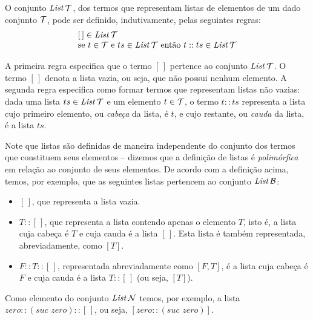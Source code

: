 \begin{Definition}
O conjunto $\textit{List\/}\, \mathcal{T}$, dos termos que representam listas de elementos de um dado conjunto $\mathcal{T}$, pode ser definido, indutivamente, pelas seguintes regras:
  \[
  \begin{array}{l}
    [\,] \in \textit{List\/}\,\mathcal{T} \\
    \text{se $t \in \mathcal{T}$ e $ts \in \textit{List\/}\,\mathcal{T}$ ent\~ao  $t :: ts \in \textit{List\/}\,\mathcal{T}$}
  \end{array}
  \]
\end{Definition}
A primeira regra especifica que o termo $[\,]$ pertence ao conjunto $\textit{List\/}\,\mathcal{T}$. O termo $[\,]$  denota a lista vazia, ou seja, que n\~ao possui nenhum elemento. A segunda regra especifica como formar termos que representam listas não vazias: dada uma lista $ts \in \textit{List\/}\,\mathcal{T}$ e um elemento $t \in\mathcal{T}$, o termo $t :: ts$ representa a lista cujo primeiro elemento, ou \emph{cabeça} da lista, é $t$, e cujo restante, ou \emph{cauda} da lista, é a lista $ts$.

Note que listas são definidas de maneira independente do conjunto dos termos que constituem seus elementos -- dizemos que a definição de listas \'e \emph{polim\'orfica\/} em rela\c{c}\~ao ao conjunto de seus elementos. De acordo com a definição acima, temos, por exemplo, que as seguintes listas pertencem ao conjunto $\textit{List\/}\,\mathcal{B}$:
\begin{itemize}
  \item $[\,]$, que representa a lista vazia.
  \item $T :: [\,]$, que representa a lista contendo apenas o elemento $T$, isto é, a lista cuja cabe\c{c}a \'e $T$ e cuja cauda é a lista $[\,]$. Esta lista é também representada, abreviadamente, como $[T]$.
  \item $F :: T :: [\,]$, representada abreviadamente como $[F,T]$, é a lista cuja cabe\c{c}a \'e $F$ e cuja cauda é a lista $T :: [\,]$ (ou seja, $[T]$).
\end{itemize}
Como elemento do conjunto $\textit{List\/}\,\mathcal{N}$ temos, por exemplo, a lista $zero :: (suc\,\,zero) :: [\,]$, ou seja, $[zero :: (suc\,\,zero)]$.

